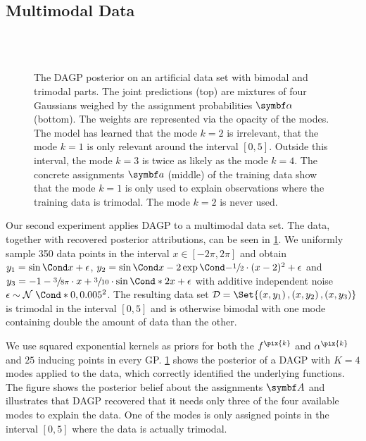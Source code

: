\subsection{Multimodal Data}
\label{sub:data_association:semi_bimodal}
%
\begin{figure}[tp]
    \centering
    \\%
    \vspace{\figureskip}%
    \\%
    \vspace{\figureskip}%
    \caption{
        \label{fig:data_association:semi_bimodal}
        The DAGP posterior on an artificial data set with bimodal and trimodal parts.
        The joint predictions (top) are mixtures of four Gaussians weighed by the assignment probabilities $\mat{\alpha}$ (bottom).
        The weights are represented via the opacity of the modes.
        The model has learned that the mode $k = 2$ is irrelevant, that the mode $k = 1$ is only relevant around the interval $[0, 5]$.
        Outside this interval, the mode $k = 3$ is twice as likely as the mode $k = 4$.
        The concrete assignments $\mat{a}$ (middle) of the training data show that the mode $k = 1$ is only used to explain observations where the training data is trimodal.
        The mode $k = 2$ is never used.
    }
\end{figure}
%
Our second experiment applies DAGP to a multimodal data set.
The data, together with recovered posterior attributions, can be seen in \cref{fig:data_association:semi_bimodal}.
We uniformly sample 350 data points in the interval $x \in [-2\pi, 2\pi]$ and obtain $y_1 = \Fun{\sin}{x} + \epsilon$, $y_2 = \Fun{\sin}{x} - 2 \Fun{\exp}{-\sfrac{1}{2} \cdot (x-2)^2} + \epsilon$ and $y_3 = -1 - \sfrac{3}{8\pi} \cdot x + \sfrac{3}{10} \cdot \Fun*{\sin}{2x} + \epsilon$ with additive independent noise $\epsilon \sim \Gaussian*{0, 0.005^2}$.
The resulting data set $\Dc = \Set{\left( x, y_1 \right), \left( x, y_2 \right), \left( x, y_3 \right)}$ is trimodal in the interval $[0, 5]$ and is otherwise bimodal with one mode containing double the amount of data than the other.

We use squared exponential kernels as priors for both the $f^{\pix{k}}$ and $\alpha^{\pix{k}}$ and $25$ inducing points in every GP.
\cref{fig:data_association:semi_bimodal} shows the posterior of a DAGP with $K = 4$ modes applied to the data, which correctly identified the underlying functions.
The figure shows the posterior belief about the assignments $\mat{A}$ and illustrates that DAGP recovered that it needs only three of the four available modes to explain the data.
One of the modes is only assigned points in the interval $[0, 5]$ where the data is actually trimodal.

